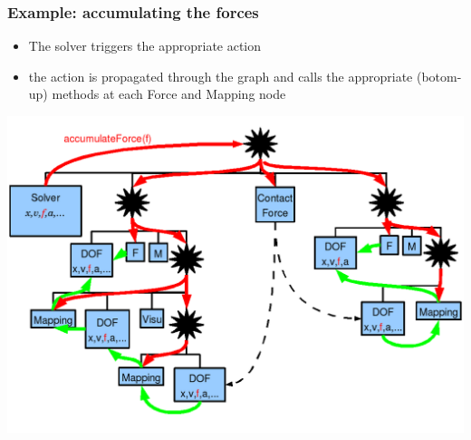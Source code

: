 \documentclass[a4paper,compress]{beamer}
\begin{document}

\begin{frame}
 \frametitle{Example: accumulating the forces}
\begin{itemize}
 \item The solver triggers the appropriate action
 \item the action is propagated through the graph and calls the appropriate (botom-up) methods at each Force and Mapping node
\end{itemize}
\begin{center}
 \includegraphics[width=0.8\linewidth]{layered-contacts-action-accumulateForces.png}
\end{center}

\end{frame}



% 
% 
% 
% 
% 
% 
\end{document}
